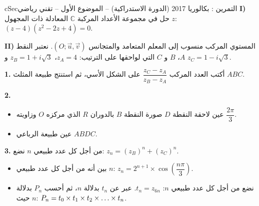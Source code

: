 \documentclass[12pt,a4paper]{article}
\newenvironment{BOX}[2]{\begin{otherlanguage}{english}\begin{arbox}{#1}{#2}}{\end{arbox}\end{otherlanguage}}
\newcounter{exo}
\newenvironment{tamrin}[1]{\stepcounter{exo}\begin{BOX}{cSec}{التمرين \theexo: #1}}{\end{BOX}}
\renewcommand{\dots}{\mathinner{\ldotp\ldotp\ldotp}}
\newenvironment{sq}{\begin{itemize}[leftmargin=2.4em,itemsep=3pt]}{\end{itemize}}
\newcommand{\qa}{\item[(أ)]}\newcommand{\qb}{\item[(ب)]}\newcommand{\qc}{\item[(جـ)]}\newcommand{\qd}{\item[(د)]}\newcommand{\qe}{\item[(هـ)]}
\newcommand{\QQ}[1]{\par\smallskip\textbf{#1.} }
\begin{document}
\begin{tamrin}{بكالوريا 2017 (الدورة الاستدراكية) -- الموضوع الأول -- تقني رياضي}
\textbf{I)} حل في مجموعة الأعداد المركبة $\mathbb{C}$ المعادلة ذات المجهول $z$: $(z-4)(z^2-2z+4)=0$.

\textbf{II)} المستوي المركب منسوب إلى المعلم المتعامد والمتجانس $(O;\vec u,\vec v)$. نعتبر النقط $A$، $B$ و $C$ التي لواحقها على الترتيب: $z_A=4$، $z_B=1+i\sqrt3$ و $z_C=1-i\sqrt3$.

\QQ{1} أكتب العدد المركب $\dfrac{z_C-z_A}{z_B-z_A}$ على الشكل الأسي، ثم استنتج طبيعة المثلث $ABC$.

\QQ{2}
\begin{sq}
\qa عين لاحقة النقطة $D$ صورة النقطة $B$ بالدوران $R$ الذي مركزه $O$ وزاويته $\dfrac{2\pi}{3}$.
\qb عين طبيعة الرباعي $ABDC$.
\end{sq}
\QQ{3} من أجل كل عدد طبيعي $n$ نضع: $z_n=(z_B)^n+(z_C)^n$.
\begin{sq}
\qa بين أنه من أجل كل عدد طبيعي $n$: $z_n=2^{n+1}\times\cos\left(\dfrac{n\pi}{3}\right)$.
\qb نضع من أجل كل عدد طبيعي $n$: $t_n=z_{6n}$. عبر عن $t_n$ بدلالة $n$، ثم أحسب $P_n$ بدلالة $n$ حيث: $P_n=t_0\times t_1\times t_2\times\dots\times t_n$.
\end{sq}
\end{tamrin}
\end{document}
